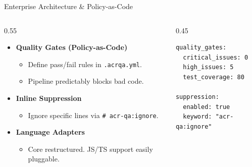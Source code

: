 \documentclass[aspectratio=169, 10pt]{beamer}
\begin{document}
\begin{frame}[fragile]{Enterprise Architecture \& Policy-as-Code}
    \begin{columns}[T]
    \begin{column}{0.55\textwidth}
      \begin{itemize}\setlength\itemsep{1em}
        \item \textbf{Quality Gates (Policy-as-Code)}
          \begin{itemize}
            \item Define pass/fail rules in \texttt{.acrqa.yml}.
            \item Pipeline predictably blocks bad code.
          \end{itemize}
        \item \textbf{Inline Suppression}
          \begin{itemize}
            \item Ignore specific lines via \texttt{\# acr-qa:ignore}.
          \end{itemize}
        \item \textbf{Language Adapters}
          \begin{itemize}
            \item Core restructured. JS/TS support easily pluggable.
          \end{itemize}
      \end{itemize}
    \end{column}
    \begin{column}{0.45\textwidth}
      \begin{tcolorbox}[colback=acrNavy,title={\textbf{.acrqa.yml Example}},coltext=white]
\begin{lstlisting}[style=yamlstyle]
quality_gates:
  critical_issues: 0
  high_issues: 5
  test_coverage: 80

suppression:
  enabled: true
  keyword: "acr-qa:ignore"
\end{lstlisting}
      \end{tcolorbox}
    \end{column}
  \end{columns}
\end{frame}
\end{document}
